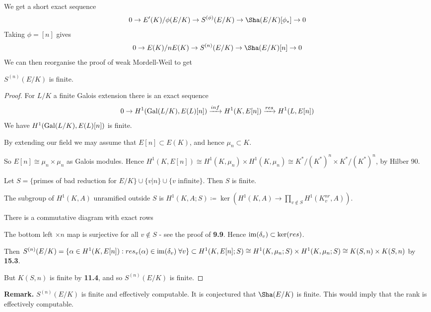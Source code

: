 \documentclass[10pt,a4paper]{article}
\begin{document}
We get a short exact sequence
\[0 \to E'(K)/\phi(E/K) \to S^{(\phi)}(E/K) \to \Sha(E/K)[\phi_\ast] \to 0\]
Taking $\phi = [n]$ gives
\[0 \to E(K)/nE(K) \to S^{(n)}(E/K) \to \Sha(E/K)[n] \to 0\]
We can then reorganise the proof of weak Mordell-Weil to get
\begin{theorem}
  $S^{(n)}(E/K)$ is finite.
\end{theorem}
\begin{proof}
  For $L/K$ a finite Galois extension there is an exact sequence
  \[0 \to H^1(\operatorname{Gal}(L/K), E(L)[n]) \xrightarrow{inf} H^1(K, E[n]) \xrightarrow{res} H^1(L, E[n])\]
  We have $H^1(\operatorname{Gal}(L/K), E(L)[n])$ is finite.

  By extending our field we may assume that $E[n] \subset E(K)$, and hence $\mu_n \subset K$.

  So $E[n] \cong \mu_n \times \mu_n$ as Galois modules. Hence $H^1(K, E[n]) \cong H^1(K, \mu_n) \times H^1(K, \mu_n) \cong K^\ast/(K^\ast)^n \times K^\ast/(K^\ast)^n$, by Hilber 90.

  Let $S = \{$primes of bad reduction for $E/K\}\cup\{v|n\}\cup\{v \text{ infinite}\}$. Then $S$ is finite.

  The subgroup of $H^1(K,A)$ unramified outside $S$ is $H^1(K,A; S)\coloneqq \ker(H^1(K,A) \to \prod_{v\notin S} H^1(K_v^{nr}, A))$.

  There is a commutative diagram with exact rows
  \begin{center}
  \end{center}
  The bottom left $\times n$ map is surjective for all $v \notin S$ - see the proof of \textbf{9.9}. Hence $\operatorname{im}(\delta_v) \subset \ker(res)$.

  Then $S^{(n)}(E/K) = \{\alpha \in H^1(K, E[n]) : res_v(\alpha) \in \Image(\delta_v)\forall v\} \subset H^1(K, E[n]; S) \cong H^1(K, \mu_n; S)\times H^1(K, \mu_n; S) \cong K(S, n)\times K(S,n)$ by \textbf{15.3}.

  But $K(S,n)$ is finite by \textbf{11.4}, and so $S^{(n)}(E/K)$ is finite.
\end{proof}
\textbf{Remark.} $S^{(n)}(E/K)$ is finite and effectively computable. It is conjectured that $\Sha(E/K)$ is finite. This would imply that the rank is effectively computable.
\end{document}
